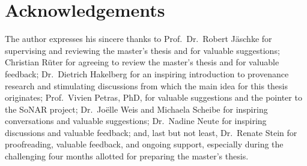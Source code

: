 \section{Acknowledgements}
\label{sec:acks}

The author expresses his sincere thanks to 
Prof.\ Dr.\ Robert Jäschke for supervising and reviewing the master's thesis
and for valuable suggestions; Christian Rüter for agreeing to review the master's thesis and for valuable feedback;
Dr.\ Dietrich Hakelberg for an inspiring introduction to provenance research
and stimulating discussions from which the main idea for this thesis originates;
%
Prof.\ Vivien Petras, PhD, for valuable suggestions and the pointer to the \gls{SoNAR} project;
%
Dr.\ Joëlle Weis and Michaela Scheibe for inspiring conversations and valuable suggestions;
Dr.\ Nadine Neute for inspiring discussions and valuable feedback;
and, last but not least,
Dr.\ Renate Stein for proofreading, valuable feedback, and ongoing support,
especially during the challenging four months allotted for preparing the master's thesis.

